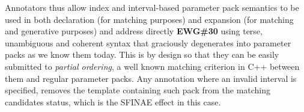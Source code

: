 \p Annotators thus allow index and interval-based parameter pack semantics to be used in both declaration (for matching purposes) and expansion (for matching and generative purposes) and address directly \textbf{EWG\#30} \cite{Abrahams2012} using terse, unambiguous and coherent syntax that graciously degenerates into parameter packs as we know them today.
This is by design so that they can be easily submitted to \textit{partial ordering}, a well known matching criterion in C++ between them and regular parameter packs.
Any annotation where an invalid interval is specified, removes the template containing such pack from the matching candidates status, which is the SFINAE \cite{sfinae} effect in this case.

